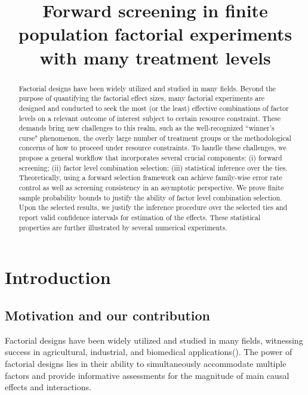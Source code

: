 \documentclass[12pt]{article}
\title{Forward screening in finite population factorial experiments with many treatment levels}
\author{}
\date{}
\begin{document}
\maketitle

\begin{abstract}
    Factorial designs have been widely utilized and studied in many fields. Beyond the purpose of quantifying the factorial effect sizes, many factorial experiments are designed and conducted to seek the most (or the least) effective combinations of factor levels on a relevant outcome of interest subject to certain resource constraint. These demands bring new challenges to this realm, such as the well-recognized ``winner's curse" phenomenon, the overly large number of treatment groups or the methodological concerns of how to proceed under resource constraints. To handle these challenges, we propose a general workflow that incorporates several crucial components: (i) forward  screening; (ii) factor level combination selection; (iii) statistical inference over the ties. Theoretically, using a forward selection framework can achieve family-wise error rate control as well as  screening consistency in an asymptotic perspective. We prove finite sample probability bounds to justify the ability of factor level combination selection. Upon the selected results, we justify the inference procedure over the selected ties and report valid confidence intervals for estimation of the effects.  These statistical properties are further illustrated by several numerical experiments.
\end{abstract}

\section{Introduction}
\subsection{Motivation and our contribution}


Factorial designs have been widely utilized and studied in many fields, witnessing success in agricultural, industrial, and biomedical applications(\cite{wu2011experiments, zhao2021regression, egami2018causal}). The power of factorial designs lies in their ability to simultaneously accommodate multiple factors and provide informative assessments for the magnitude of main causal effects and interactions. 
\end{document}
